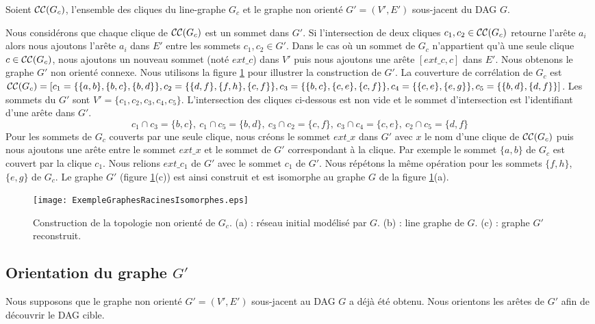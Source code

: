 Soient ${\cal CC}(G_c)$, l'ensemble des cliques du line-graphe $G_c$ et 
le graphe non orient\'e $G'=(V',E')$ sous-jacent du DAG $G$.

Nous consid\'erons que chaque clique de ${\cal CC}(G_c)$ est un sommet dans $G'$.
Si l'intersection de deux cliques $c_1, c_2 \in {\cal CC}(G_c)$ retourne l'ar\^ete $a_i$  alors nous ajoutons  l'ar\^ete $a_i $ dans $E'$ entre les sommets  $c_1, c_2 \in G'$.
Dans  le cas o\`u un sommet de  $G_c$ n'appartient qu'\`a une seule clique $c \in {\cal CC}(G_c)$, nous ajoutons  un nouveau sommet (not\'e $ext\_c$) dans $V'$ puis nous ajoutons une ar\^ete $[ext\_c, c]$ dans $E'$.
Nous obtenons le graphe $G'$ non orient\'e connexe.
Nous utilisons la figure \ref{ExempleGraphesRacinesIsomorphes} pour illustrer la construction de $G'$.
La couverture de corr\'elation de $G_c$ est ${\cal CC}(G_c) = [
 c_1 = \{\{a,b\},\{b,c\},\{b,d\}\}, 
 c_2=\{  \{d,f\},\{f,h\},\{c,f\} \}, 
 c_3 = \{  \{b,c\},\{c,e\},\{c,f\} \}, 
 c_4 = \{  \{c,e\},\{e,g\} \}, 
 c_5 = \{  \{b,d\},\{d,f\} \}]$.
Les sommets du $G'$ sont $V' = \{c_1, c_2, c_3, c_4, c_5\}$.
L'intersection des cliques ci-dessous est non vide et le sommet d'intersection est l'identifiant d'une ar\^ete dans $G'$.
$$
c_1 \cap c_3 = \{b,c\}, ~ 
c_1 \cap c_5 = \{b,d\}, ~ 
c_3 \cap c_2 = \{c,f\}, ~ 
c_3 \cap c_4 =   \{c,e\}, ~ 
c_2 \cap c_5 = \{d,f\}
$$
Pour les sommets de $G_c$ couverts par une seule clique, nous cr\'eons le sommet $ext\_x$ dans $G'$ avec $x$ le nom d'une clique de ${\cal CC}(G_c)$ 
puis nous ajoutons une ar\^ete entre le sommet $ext\_x$ et le sommet de $G'$ correspondant \`a la clique.
Par exemple le sommet $\{a,b\}$ de $G_c$ est couvert par la clique $c_1$. 
Nous relions $ext\_c_1$ de $G'$ avec le sommet $c_1$ de $G'$. 
Nous r\'ep\'etons la m\^eme op\'eration pour les sommets  $\{f,h\}$, $\{e,g\}$ de $G_c$.
Le graphe $G'$ (figure \ref{ExempleGraphesRacinesIsomorphes}(c)) est ainsi construit et est isomorphe au graphe $G$ de la figure \ref{ExempleGraphesRacinesIsomorphes}(a).
\begin{figure}[htb!] 
\centering
\texttt{[image: ExempleGraphesRacinesIsomorphes.eps]}
\caption{ Construction de la topologie non orient\'e de $G_c$.
		(a) : r\'eseau initial mod\'elis\'e par $G$.
		(b) : line graphe de $G$.
		(c) : graphe $G'$ reconstruit.
		 }
\label{ExempleGraphesRacinesIsomorphes}
\end{figure}

\subsection{Orientation du graphe $G'$}
Nous supposons que le graphe non orient\'e $G'=(V',E')$ sous-jacent au DAG $G$ a d\'ej\`a \'et\'e  obtenu. Nous orientons les ar\^etes de $G'$ afin de d\'ecouvrir  le DAG cible.
 \newline
 
